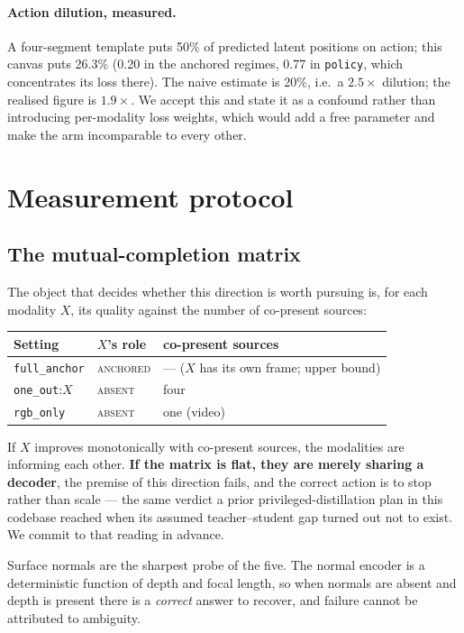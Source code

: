 \documentclass{article}
\begin{document}
\paragraph{Action dilution, measured.} A four-segment template puts 50\% of predicted latent
positions on action; this canvas puts 26.3\% (0.20 in the anchored regimes, 0.77 in
\texttt{policy}, which concentrates its loss there). The naive estimate is 20\%, i.e.\ a
$2.5\times$ dilution; the realised figure is $1.9\times$. We accept this and state it as a
confound rather than introducing per-modality loss weights, which would add a free parameter and
make the arm incomparable to every other.

\section{Measurement protocol}
\label{sec:protocol}

\subsection{The mutual-completion matrix}

The object that decides whether this direction is worth pursuing is, for each modality $X$, its
quality against the number of co-present sources:
\begin{center}
\begin{tabular}{lll}
\toprule
Setting & $X$'s role & co-present sources \\
\midrule
\texttt{full\_anchor} & \textsc{anchored} & --- ($X$ has its own frame; upper bound) \\
\texttt{one\_out}:$X$ & \textsc{absent} & four \\
\texttt{rgb\_only}    & \textsc{absent} & one (video) \\
\bottomrule
\end{tabular}
\end{center}
If $X$ improves monotonically with co-present sources, the modalities are informing each other.
\textbf{If the matrix is flat, they are merely sharing a decoder}, the premise of this direction
fails, and the correct action is to stop rather than scale --- the same verdict a prior
privileged-distillation plan in this codebase reached when its assumed teacher--student gap
turned out not to exist. We commit to that reading in advance.

Surface normals are the sharpest probe of the five. The normal encoder is a deterministic
function of depth and focal length, so when normals are absent and depth is present there is a
\emph{correct} answer to recover, and failure cannot be attributed to ambiguity.
\end{document}
